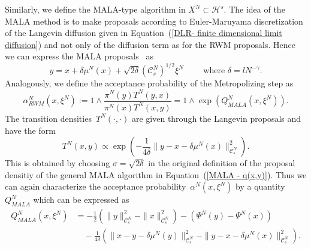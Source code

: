 Similarly, we define the MALA-type algorithm in $X^N \subset \mathcal{H}^s$. The idea of the MALA method is to make proposals according to Euler-Maruyama discretization of the Langevin diffusion given in Equation~(\ref{DLR- finite dimensional limit diffusion}) and not only of the diffusion term as for the RWM proposals. Hence we can express the MALA proposals~\autocite[Equation~(2.17)]{Pillai2012} as
\begin{equation}
\label{DLR-Setting: Definiton MALA-proposal}
 y = x + \delta \mu^N(x) + \sqrt{2 \delta} (\mathcal{C}_s^{N})^{1/2} \xi^{N} \qquad \text{ where } \delta = l N^{-\gamma}.
\end{equation}
Analogously, we define the acceptance probability of the Metropolizing step as
\begin{equation}
 \label{DLR-Setting: Definition acceptance proba MALA}
 \alpha^N_{RWM}(x, \xi^N) := 1 \wedge \frac{\pi^N(y)T^N(y,x)}{\pi^N(x)T^N(x,y)} = 1 \wedge \exp (Q^N_{MALA}(x, \xi^N) ).
\end{equation}
The transition densities~$T^N(\cdot, \cdot)$ are given through the Langevin proposals and have the form
\begin{equation*}
 T^N (x,y) \varpropto \exp \left( - \frac{1}{4 \delta} \| y-x- \delta \mu^N(x) \|_{\mathcal{C}_s^N}^2 \right).
\end{equation*}
This is obtained by choosing $\sigma = \sqrt{2\delta} $ in the original definition of the proposal densitiy of the general MALA algorithm in Equation~(\ref{MALA - q(x,y)}). Thus we can again characterize the acceptance probability~$\alpha^N(x,\xi^N)$ by a quantity $Q^N_{MALA}$ which can be expressed as
\begin{equation}
 \label{DLR-Setting: Definition Q MALA}
 \begin{split}
  Q_{MALA}^{N}(x, \xi^{N}) & = - \frac{1}{2} \left(\| y \|_{\mathcal{C}_s^N}^2 - \| x \|_{\mathcal{C}_s^N}^2\right) - \left( \Psi^N(y) - \Psi^N(x) \right) \\
  & \quad - \frac{1}{4 \delta} \left( \| x - y - \delta \mu^N(y) \|_{\mathcal{C}_s^N}^2 -  \| y - x - \delta \mu^N(x) \|_{\mathcal{C}_s^N}^2 \right).
 \end{split}
\end{equation}

